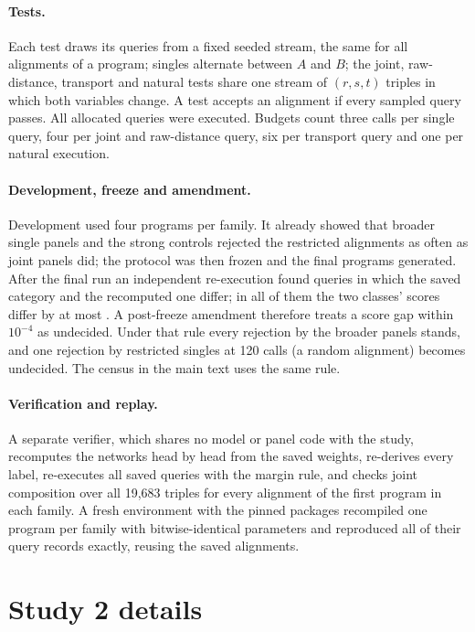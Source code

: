 \paragraph{Tests.}
Each test draws its queries from a fixed seeded stream, the same for all alignments of a program; singles alternate
between $A$ and $B$; the joint, raw-distance, transport and natural tests share one stream of $(r,s,t)$ triples in
which both variables change. A test accepts an alignment if every sampled query passes. All allocated queries were
executed. Budgets count three calls per single query, four per joint and raw-distance query, six per transport query
and one per natural execution.

\paragraph{Development, freeze and amendment.}
Development used four programs per family. It already showed that broader single panels and the strong controls
rejected the restricted alignments as often as joint panels did; the protocol was then frozen and the final
programs generated. After the final run an independent re-execution found \CmpNearTies{} queries in which the
saved category and the recomputed one differ; in all of them the two classes' scores differ by at most
\CmpTieGap{}. A post-freeze amendment therefore treats a score gap within $10^{-4}$ as undecided. Under that rule
every rejection by the broader panels stands, and one rejection by restricted singles at 120 calls (a random
alignment) becomes undecided. The census in the main text uses the same rule.

\paragraph{Verification and replay.}
A separate verifier, which shares no model or panel code with the study, recomputes the networks head by head from
the saved weights, re-derives every label, re-executes all \CmpQueries{} saved queries with the margin rule, and
checks joint composition over all 19,683 triples for every alignment of the first program in each family. A fresh
environment with the pinned packages recompiled one program per family with bitwise-identical parameters and
reproduced all \CmpReplayRecords{} of their query records exactly, reusing the saved alignments.

\section{Study 2 details}\label{app:trained}



